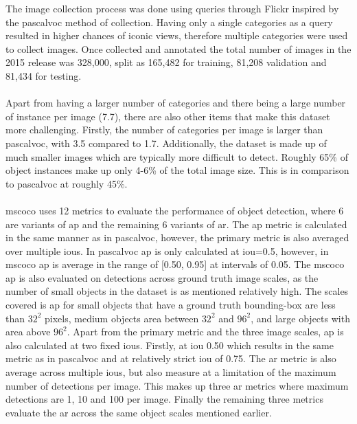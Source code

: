 The image collection process was done using queries through Flickr inspired by the \gls{pascalvoc} method of collection. Having only a single categories as a query resulted in higher chances of iconic views, therefore multiple categories were used to collect images. Once collected and annotated the total number of images in the 2015 release was 328,000, split as 165,482 for training, 81,208 validation and 81,434 for testing.
\\\\
Apart from having a larger number of categories and there being a large number of instance per image (7.7), there are also other items that make this dataset more challenging. Firstly, the number of categories per image is larger than \gls{pascalvoc}, with 3.5 compared to 1.7. Additionally, the dataset is made up of much smaller images which are typically more difficult to detect. Roughly 65\% of object instances make up only 4-6\% of the total image size. This is in comparison to \gls{pascalvoc} at roughly 45\%.
\\\\
\gls{mscoco} uses 12 metrics to evaluate the performance of object detection, where 6 are variants of \gls{ap} and the remaining 6 variants of \gls{ar}. The \gls{ap} metric is calculated in the same manner as in \gls{pascalvoc}, however, the primary metric is also averaged over multiple \glspl{iou}. In \gls{pascalvoc} \gls{ap} is only calculated at \gls{iou}=0.5, however, in \gls{mscoco} \gls{ap} is average in the range of [0.50, 0.95] at intervals of 0.05. The \gls{mscoco} \gls{ap} is also evaluated on detections across ground truth image scales, as the number of small objects in the dataset is as mentioned relatively high. The scales covered is \gls{ap} for small objects that have a ground truth bounding-box are less than $32^2$ pixels, medium objects area between $32^2$ and $96^2$, and large objects with area above $96^2$. Apart from the primary metric and the three image scales, \gls{ap} is also calculated at two fixed \glspl{iou}. Firstly, at \gls{iou} 0.50 which results in the same metric as in \gls{pascalvoc} and at relatively strict \gls{iou} of 0.75. The \gls{ar} metric is also average across multiple \glspl{iou}, but also measure at a limitation of the maximum number of detections per image. This makes up three \gls{ar} metrics where maximum detections are 1, 10 and 100 per image. Finally the remaining three metrics evaluate the \gls{ar} across the same object scales mentioned earlier.